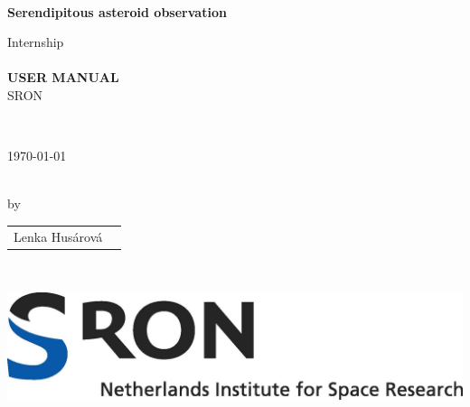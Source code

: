 


\newpage

\thispagestyle{empty}
\begin{center}




\textsc{\Large }\\[1cm]
\Huge \color{purple} \textbf{Serendipitous asteroid observation}\\[0.3cm]
\color{black}

\Large Internship\\

\textsc{\Large }\\[0.5cm]

\color{purple}
{\huge  \bfseries USER MANUAL}\\[0.2cm]
\color{black}
\large SRON

\textsc{\Large }\\[0.5cm]

\begin{large}\today \end{large}
\textsc{\Large }\\[0.5cm]



\large by
\textsc{\Large }\\[0.5cm]

\begin{table}[H]
\large
    \centering
    
    \begin{tabular}{l l}
    
 
    \Large Lenka Husárová
    
    \end{tabular}
\end{table}


\textsc{\Large }\\[10cm]

\begin{center}
\includegraphics[scale=1]{Figures/SRONLOGO.jpg}
\end{center}

\end{center}